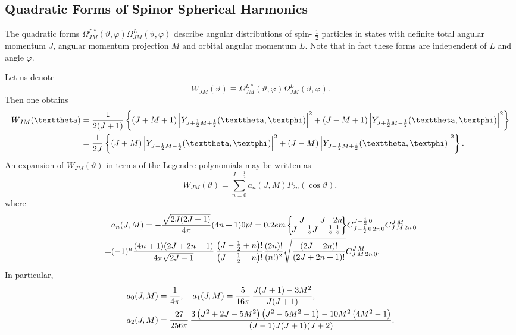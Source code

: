 \subsection{Quadratic Forms of Spinor Spherical Harmonics}\label{sec:7.2.10}
The quadratic forms $\Omega_{J M}^{L*}(\vartheta, \varphi) \Omega_{J M}^{L}(\vartheta, \varphi)$ describe angular distributions of spin- $\frac{1}{2}$ particles in states with definite total angular momentum $J$, angular momentum projection $M$ and orbital angular momentum $L$. Note that in fact these forms are independent of $L$ and angle $\varphi$.

Let us denote
\begin{equation}
W_{J M}(\vartheta) \equiv \Omega_{J M}^{L*}(\vartheta, \varphi) \Omega_{J M}^{L}(\vartheta, \varphi). \label{eq:7:2:46}
\end{equation}
Then one obtains
\begin{align}
W_{J M}(\vartheta) & =\frac{1}{2(J+1)}\left\{(J+M+1)\left|Y_{J+\frac{1}{2} M+\frac{1}{2}}(\vartheta, \varphi)\right|^{2}+(J-M+1)\left|Y_{J+\frac{1}{2} M-\frac{1}{2}}(\vartheta, \varphi)\right|^{2}\right\}  \notag\\
& =\frac{1}{2 J}\left\{(J+M)\left|Y_{J-\frac{1}{2} M-\frac{1}{2}}(\vartheta, \varphi)\right|^{2}+(J-M)\left|Y_{J-\frac{1}{2} M+\frac{1}{2}}(\vartheta, \varphi)\right|^{2}\right\}. \label{eq:7:2:47}
\end{align}
An expansion of $W_{J M}(\vartheta)$ in terms of the Legendre polynomials may be written as
\begin{equation}
W_{J M}(\vartheta)=\sum_{n=0}^{J-\frac{1}{2}} a_{n}(J, M) P_{2 n}(\cos \vartheta), \label{eq:7:2:48}
\end{equation}
where
\begin{align}
& a_{n}(J, M)=-\frac{\sqrt{2 J(2 J+1)}}{4 \pi}(4 n+1)\sixj{J}{J}{2 n}{J-\frac{1}{2}}{J-\frac{1}{2}}{\frac{1}{2}} \clebsch{J-\frac{1}{2}}{0}{2n}{0}{J-\frac{1}{2}}{0} \clebsch{J}{M}{2n}{0}{J}{M}  \notag\\
= & (-1)^{n} \frac{(4 n+1)(2 J+2 n+1)}{4 \pi \sqrt{2 J+1}}  \, \frac{\left(J-\frac{1}{2}+n\right)!}{\left(J-\frac{1}{2}-n\right)!} \frac{(2 n)!}{(n!)^{2}} \sqrt{\frac{(2 J-2 n)!}{(2 J+2 n+1)!}} \clebsch{J}{M}{2n}{0}{J}{M}. \label{eq:7:2:49}
\end{align}
In particular,
\begin{align}
& a_{0}(J, M)=\frac{1}{4 \pi}, \quad a_{1}(J, M)=\frac{5}{16 \pi}  \, \frac{J(J+1)-3 M^{2}}{J(J+1)}, \label{eq:7:2:50}\\
& a_{2}(J, M)=\frac{27}{256 \pi}  \, \frac{3\left(J^{2}+2 J-5 M^{2}\right)\left(J^{2}-5 M^{2}-1\right)-10 M^{2}\left(4 M^{2}-1\right)}{(J-1) J(J+1)(J+2)}. \notag
\end{align}
